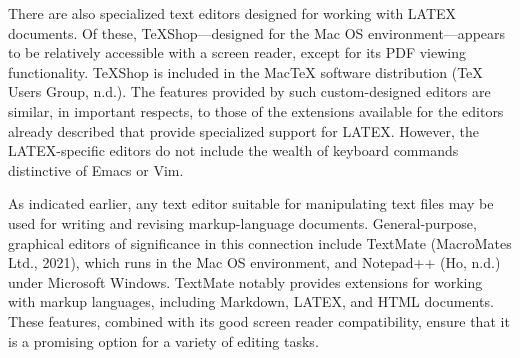 \documentclass[11pt]{sig-alternate}
\begin{document}
\begin{large}
There are also specialized text editors designed for working with LATEX documents. Of these, TeXShop—designed for the Mac OS environment—appears to be relatively accessible with a screen reader, except for its PDF viewing functionality. TeXShop is included in the MacTeX software distribution (TeX Users Group, n.d.). The features provided by such custom-designed editors are similar, in important respects, to those of the extensions available for the editors already described that provide specialized support for LATEX. However, the LA\-TEX-specific editors do not include the wealth of keyboard commands distinctive of Emacs or Vim.

As indicated earlier, any text editor suitable for manipulating text files may be used for writing and revising markup-language documents. General-purpose, graphical editors of significance in this connection include TextMate (MacroMates Ltd., 2021), which runs in the Mac OS environment, and Notepad++ (Ho, n.d.) under Microsoft Windows. TextMate notably provides extensions for working with markup languages, including Markdown, LATEX, and HT\-ML documents. These features, combined with its good screen reader compatibility, ensure that it is a promising option for a variety of editing tasks.


\end{large}
\end{document}
